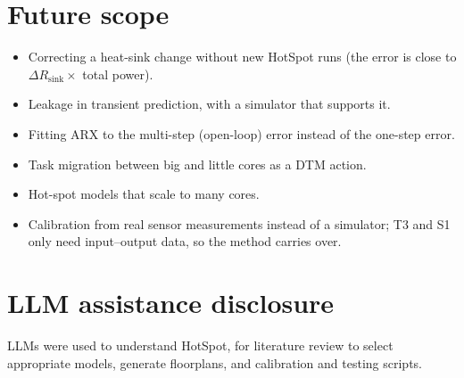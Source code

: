\documentclass[11pt,a4paper]{article}
\begin{document}
\section{Future scope}
\begin{itemize}
  \item Correcting a heat-sink change without new HotSpot runs (the error is close to
        $\Delta R_\text{sink}\times$ total power).
  \item Leakage in transient prediction, with a simulator that supports it.
  \item Fitting ARX to the multi-step (open-loop) error instead of the one-step error.
  \item Task migration between big and little cores as a DTM action.
  \item Hot-spot models that scale to many cores.
  \item Calibration from real sensor measurements instead of a simulator; T3 and S1 only need
        input--output data, so the method carries over.
\end{itemize}

\section{LLM assistance disclosure}
LLMs were used to understand HotSpot, for literature review to select appropriate models, generate
floorplans, and calibration and testing scripts.

\appendix
\end{document}
